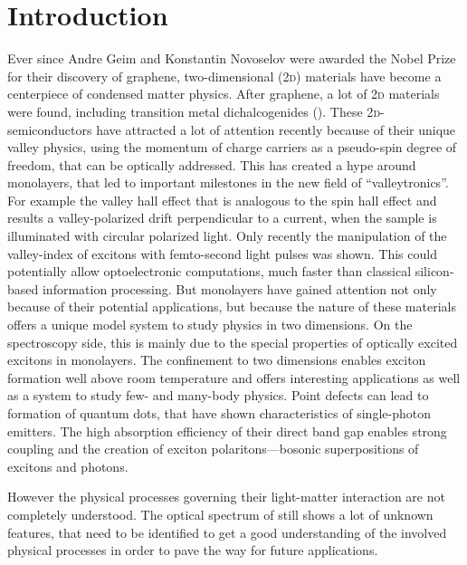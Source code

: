 \chapter{Introduction}
Ever since Andre Geim and Konstantin Novoselov were awarded the Nobel Prize for their discovery of graphene, two-dimensional (2\textsc{d}) materials have become a centerpiece of condensed matter physics\cite{novoselov_electric_2004}. After graphene, a lot of 2\textsc{d} materials were found, including transition metal dichalcogenides (\tmds\!). These 2\textsc{d}-semiconductors have attracted a lot of attention recently because of their unique valley physics, using the momentum of charge carriers as a pseudo-spin degree of freedom, that can be optically addressed\cite{wang_electronics_2012}. This has created a hype around \tmdg monolayers, that led to important milestones in the new field of ``valleytronics''. For example the valley hall effect\cite{mak_valley_2014} that is analogous to the spin hall effect and results a valley-polarized drift perpendicular to a current, when the sample is illuminated with circular polarized light. Only recently the manipulation of the valley-index of excitons with femto-second light pulses was shown\cite{langer_lightwave_2018}. This could potentially allow optoelectronic computations, much faster than classical silicon-based information processing. But \tmdg monolayers have gained attention not only because of their potential applications, but because the nature of these materials offers a unique model system to study physics in two dimensions. On the spectroscopy side, this is mainly due to the special properties of optically excited excitons in \tmdg monolayers. The confinement to two dimensions enables exciton formation well above room temperature and offers interesting applications as well as a system to study few- and many-body physics\cite{chernikov_exciton_2014}. Point defects can lead to formation of quantum dots, that have shown characteristics of single-photon emitters\cite{srivastava_optically_2015}. The high absorption efficiency of their direct band gap enables strong coupling and the creation of exciton polaritons---bosonic superpositions of excitons and photons\cite{liu_control_2017,zhang_photonic-crystal_2018}.

However the physical processes governing their light-matter interaction are not completely understood\cite{koperski_optical_2017}. The optical spectrum of \tmds still shows a lot of unknown features, that need to be identified to get a good understanding of the involved physical processes in order to pave the way for future applications. 

